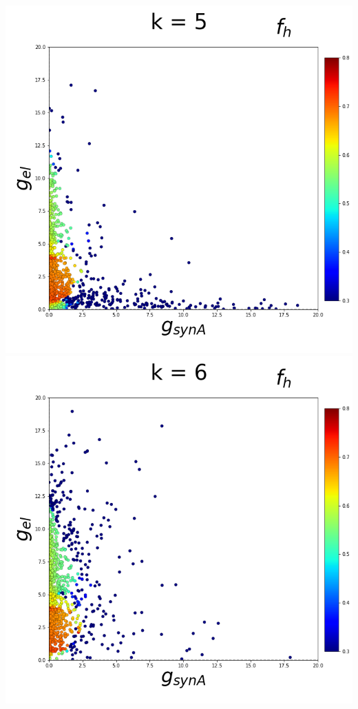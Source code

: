 \documentclass[11pt]{article}
\begin{document}
\begin{center}
\includegraphics[scale=0.125]{DSN_figs/STGCircuit_DSN_c=0_rs=1_k=5.png}
\includegraphics[scale=0.125]{DSN_figs/STGCircuit_DSN_c=0_rs=1_k=6.png}

\end{center}
\end{document}
